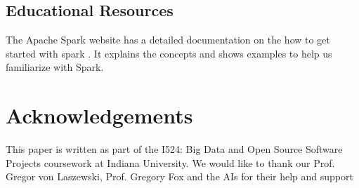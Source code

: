 \documentclass[9pt,twocolumn,twoside]{styles/osajnl}
\begin{document}
\subsection{Educational Resources}
 The Apache Spark website has a detailed documentation on the how to get started with spark \cite{www-apache-spark}. It explains the concepts and shows examples to help us familiarize with Spark.
 
\section*{Acknowledgements}

This paper is written as part of the I524: Big Data and Open Source Software Projects coursework at Indiana University. We would like to thank our Prof. Gregor von Laszewski, Prof. Gregory Fox and the AIs for their help and support



 
\end{document}
